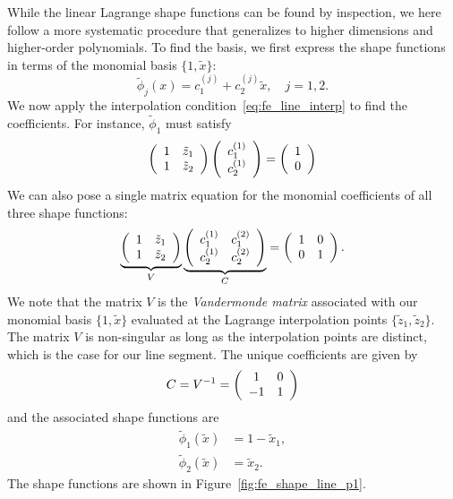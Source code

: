 While the linear Lagrange shape functions can be found by inspection, we here follow a more systematic procedure that generalizes to higher dimensions and higher-order polynomials. To find the basis, we first express the shape functions in terms of the monomial basis $\{1,\tilde x\}$:
\begin{equation}
  \tilde \phi_j(x) = c^{(j)}_1 + c^{(j)}_2 \tilde x,  \quad j = 1, 2.
  \label{eq:fe_lin_line_rep}
\end{equation}
We now apply the interpolation condition~\eqref{eq:fe_line_interp} to find the coefficients.  For instance, $\tilde \phi_1$ must satisfy
\begin{equation*}
  \bmat{cc}
  1 & \tilde z_1 \\
  1 & \tilde z_2 \\
  \emat
  \bmat{c}
  c^{(1)}_1 \\ c^{(1)}_2
  \emat
  =
  \bmat{c}
  1 \\ 0 
  \emat
\end{equation*}
We can also pose a single matrix equation for the monomial coefficients of all three shape functions: 
\begin{equation*}
  \underbrace{ \bmat{cc}
  1 & \tilde z_1 \\
  1 & \tilde z_2 \\
  \emat }_{V}
  \underbrace{ 
  \bmat{cc}
  c_1^{(1)} & c_1^{(2)} \\
  c_2^{(1)} & c_2^{(2)} \\
  \emat }_{C}
  =
  \bmat{cc}
  1 & 0 \\
  0 & 1 \\
  \emat.
\end{equation*}
We note that the matrix $V$ is the \emph{Vandermonde matrix} associated with our monomial basis $\{ 1,\tilde x\}$ evaluated at the Lagrange interpolation points $\{\tilde z_1, \tilde z_2\}$.  The matrix $V$ is non-singular as long as the interpolation points are distinct, which is the case for our line segment. The unique coefficients are given by
\begin{equation*}
  C = V^{-1} = \bmat{cc} 1 & 0 \\ -1 & 1 \emat
\end{equation*}
and the associated shape functions are
\begin{align*}
  \tilde \phi_1(\tilde x) &= 1 - \tilde x_1 , \\
  \tilde \phi_2(\tilde x) &= \tilde x_2.
\end{align*}
The shape functions are shown in Figure~\ref{fig:fe_shape_line_p1}.

